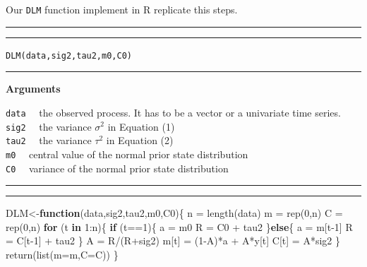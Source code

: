 \documentclass[
]{book}
\newenvironment{Shaded}{\begin{snugshade}}{\end{snugshade}}
\newcommand{\AttributeTok}[1]{\textcolor[rgb]{0.77,0.63,0.00}{#1}}
\newcommand{\ControlFlowTok}[1]{\textcolor[rgb]{0.13,0.29,0.53}{\textbf{#1}}}
\newcommand{\DecValTok}[1]{\textcolor[rgb]{0.00,0.00,0.81}{#1}}
\newcommand{\FunctionTok}[1]{\textcolor[rgb]{0.00,0.00,0.00}{#1}}
\newcommand{\NormalTok}[1]{#1}
\newcommand{\OtherTok}[1]{\textcolor[rgb]{0.56,0.35,0.01}{#1}}
\newcommand{\SpecialCharTok}[1]{\textcolor[rgb]{0.00,0.00,0.00}{#1}}
\theoremstyle{break}
\theoremstyle{nonumberplain}
\begin{document}
Our \texttt{DLM} function implement in R replicate this steps.\\

\hrule
\hrule

\hfill\break
\texttt{DLM(data,sig2,tau2,m0,C0)}\\

\hrule

\textbf{Arguments}

\texttt{data} ~~the observed process. It has to be a vector or a
univariate time series.\\
\texttt{sig2} ~~the variance \(\sigma^{2}\) in Equation (1)\\
\texttt{tau2} ~~the variance \(\tau^{2}\) in Equation (2)\\
\texttt{m0} ~~central value of the normal prior state distribution\\
\texttt{C0} ~~variance of the normal prior state distribution

\hrule
\hrule

\begin{Shaded}
\begin{Highlighting}[]
\NormalTok{DLM}\OtherTok{\textless{}{-}}\ControlFlowTok{function}\NormalTok{(data,sig2,tau2,m0,C0)\{}
\NormalTok{  n  }\OtherTok{=} \FunctionTok{length}\NormalTok{(data)}
\NormalTok{  m  }\OtherTok{=} \FunctionTok{rep}\NormalTok{(}\DecValTok{0}\NormalTok{,n)}
\NormalTok{  C  }\OtherTok{=} \FunctionTok{rep}\NormalTok{(}\DecValTok{0}\NormalTok{,n)}
  \ControlFlowTok{for}\NormalTok{ (t }\ControlFlowTok{in} \DecValTok{1}\SpecialCharTok{:}\NormalTok{n)\{}
    \ControlFlowTok{if}\NormalTok{ (t}\SpecialCharTok{==}\DecValTok{1}\NormalTok{)\{}
\NormalTok{      a }\OtherTok{=}\NormalTok{ m0}
\NormalTok{      R }\OtherTok{=}\NormalTok{ C0 }\SpecialCharTok{+}\NormalTok{ tau2}
\NormalTok{    \}}\ControlFlowTok{else}\NormalTok{\{}
\NormalTok{      a }\OtherTok{=}\NormalTok{ m[t}\DecValTok{{-}1}\NormalTok{]}
\NormalTok{      R }\OtherTok{=}\NormalTok{ C[t}\DecValTok{{-}1}\NormalTok{] }\SpecialCharTok{+}\NormalTok{ tau2}
\NormalTok{    \}}
\NormalTok{    A }\OtherTok{=}\NormalTok{ R}\SpecialCharTok{/}\NormalTok{(R}\SpecialCharTok{+}\NormalTok{sig2)}
\NormalTok{    m[t] }\OtherTok{=}\NormalTok{ (}\DecValTok{1}\SpecialCharTok{{-}}\NormalTok{A)}\SpecialCharTok{*}\NormalTok{a }\SpecialCharTok{+}\NormalTok{ A}\SpecialCharTok{*}\NormalTok{y[t]}
\NormalTok{    C[t] }\OtherTok{=}\NormalTok{ A}\SpecialCharTok{*}\NormalTok{sig2}
\NormalTok{  \}}
  \FunctionTok{return}\NormalTok{(}\FunctionTok{list}\NormalTok{(}\AttributeTok{m=}\NormalTok{m,}\AttributeTok{C=}\NormalTok{C))}
\NormalTok{\}}
\end{Highlighting}
\end{Shaded}
\end{document}
